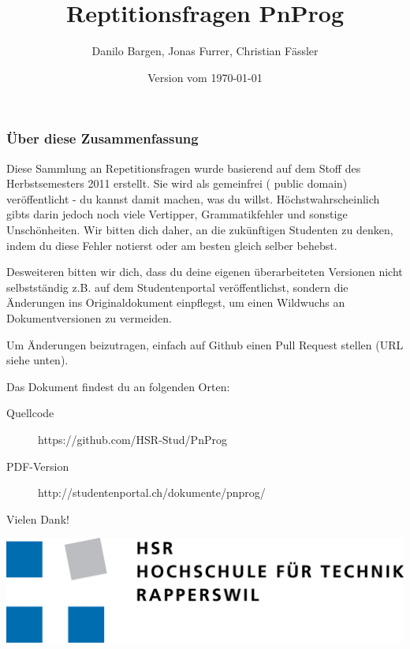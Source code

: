 \documentclass[10pt,a4paper]{scrartcl}
\author{Danilo Bargen, Jonas Furrer, Christian Fässler}
\title{Reptitionsfragen PnProg}
\date{Version vom \today}
\begin{document}
\begin{titlepage}
	\maketitle
	\begin{center}\Huge\ccPublicDomain\end{center}

	\vspace{65mm}

	\subsubsection*{Über diese Zusammenfassung}

	Diese Sammlung an Repetitionsfragen wurde basierend auf dem Stoff des Herbstsemesters 2011 erstellt.
	Sie wird als gemeinfrei ({\ccPublicDomain} public domain) veröffentlicht - du kannst damit machen,
	was du willst. Höchstwahrscheinlich gibts darin jedoch noch viele Vertipper, Grammatikfehler und
	sonstige Unschönheiten. Wir bitten dich daher, an die zukünftigen Studenten zu denken, indem du
	diese Fehler notierst oder am besten gleich selber behebst.

	Desweiteren bitten wir dich, dass du deine eigenen überarbeiteten Versionen nicht selbstständig
	z.B.  auf dem Studentenportal veröffentlichst, sondern die Änderungen ins Originaldokument
	einpflegst, um einen Wildwuchs an Dokumentversionen zu vermeiden.

	Um Änderungen beizutragen, einfach auf Github einen Pull Request stellen (URL siehe unten).

	Das Dokument findest du an folgenden Orten:

	\begin{description}
		\item[Quellcode] https://github.com/HSR-Stud/PnProg
		\item[PDF-Version] http://studentenportal.ch/dokumente/pnprog/
	\end{description}

	Vielen Dank!

	\vspace{10mm}

	\includegraphics{hsr_logo.png}
	\thispagestyle{empty} %
\end{titlepage}
\end{document}
